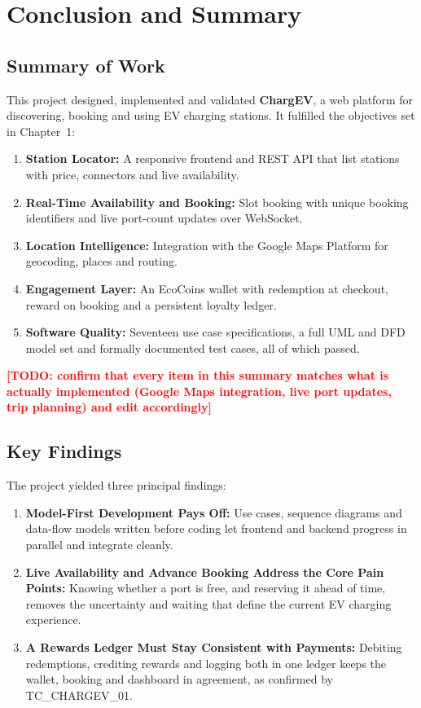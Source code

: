 \documentclass{tietreport}
\newcommand{\todo}[1]{\textcolor{red}{\textbf{[TODO: #1]}}}
\begin{document}
\chapter{Conclusion and Summary}

\section{Summary of Work}

This project designed, implemented and validated
\textbf{ChargEV}, a web platform for discovering, booking
and using EV charging stations. It fulfilled the objectives
set in Chapter~1:

\begin{enumerate}
  \item \textbf{Station Locator:} A responsive frontend and
    REST API that list stations with price, connectors
    and live availability.
  \item \textbf{Real-Time Availability and Booking:} Slot
    booking with unique booking identifiers and live
    port-count updates over WebSocket.
  \item \textbf{Location Intelligence:} Integration with
    the Google Maps Platform for geocoding, places and
    routing.
  \item \textbf{Engagement Layer:} An EcoCoins wallet with
    redemption at checkout, reward on booking and a
    persistent loyalty ledger.
  \item \textbf{Software Quality:} Seventeen use case
    specifications, a full UML and DFD model set and
    formally documented test cases, all of which passed.
\end{enumerate}

\todo{confirm that every item in this summary matches what is actually implemented (Google Maps integration, live port updates, trip planning) and edit accordingly}

\section{Key Findings}

The project yielded three principal findings:

\begin{enumerate}
  \item \textbf{Model-First Development Pays Off:} Use
    cases, sequence diagrams and data-flow models
    written before coding let frontend and backend
    progress in parallel and integrate cleanly.
  \item \textbf{Live Availability and Advance Booking
    Address the Core Pain Points:} Knowing whether a port
    is free, and reserving it ahead of time, removes the
    uncertainty and waiting that define the current EV
    charging experience.
  \item \textbf{A Rewards Ledger Must Stay Consistent with
    Payments:} Debiting redemptions, crediting rewards
    and logging both in one ledger keeps the wallet,
    booking and dashboard in agreement, as confirmed by
    TC\_CHARGEV\_01.
\end{enumerate}
\end{document}
